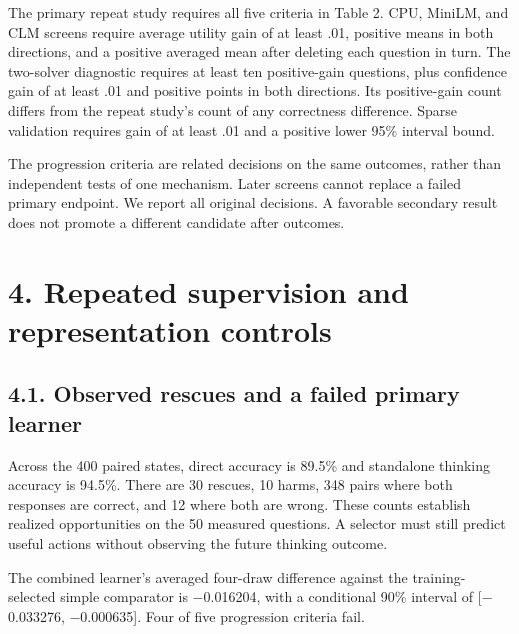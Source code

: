\documentclass[11pt,a4paper]{article}
\begin{document}
The primary repeat study requires all five criteria in Table 2. CPU, MiniLM, and CLM screens require average utility gain of at least .01, positive means in both directions, and a positive averaged mean after deleting each question in turn. The two-solver diagnostic requires at least ten positive-gain questions, plus confidence gain of at least .01 and positive points in both directions. Its positive-gain count differs from the repeat study's count of any correctness difference. Sparse validation requires gain of at least .01 and a positive lower 95\% interval bound.

The progression criteria are related decisions on the same outcomes, rather than independent tests of one mechanism. Later screens cannot replace a failed primary endpoint. We report all original decisions. A favorable secondary result does not promote a different candidate after outcomes.

\section*{4. Repeated supervision and representation controls}\label{sec:4-repeated-supervision-and-representation-controls}
\subsection*{4.1. Observed rescues and a failed primary learner}\label{sec:41-observed-rescues-and-a-failed-primary-learner}
Across the 400 paired states, direct accuracy is 89.5\% and standalone thinking accuracy is 94.5\%. There are 30 rescues, 10 harms, 348 pairs where both responses are correct, and 12 where both are wrong. These counts establish realized opportunities on the 50 measured questions. A selector must still predict useful actions without observing the future thinking outcome.

The combined learner's averaged four-draw difference against the training-selected simple comparator is \ensuremath{-}0.016204, with a conditional 90\% interval of [\ensuremath{-}0.033276, \ensuremath{-}0.000635]. Four of five progression criteria fail.
\end{document}
